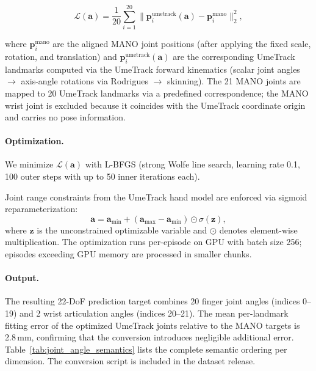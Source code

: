 \documentclass[letterpaper]{article} %
\begin{document}
\begin{equation}
\mathcal{L}(\mathbf{a}) = \frac{1}{20} \sum_{i=1}^{20} \bigl\|\mathbf{p}_i^{\text{umetrack}}(\mathbf{a}) - \mathbf{p}_i^{\text{mano}}\bigr\|_2^2,
\end{equation}

where $\mathbf{p}_i^{\text{mano}}$ are the aligned MANO joint positions (after applying the fixed scale, rotation, and translation) and $\mathbf{p}_i^{\text{umetrack}}(\mathbf{a})$ are the corresponding UmeTrack landmarks computed via the UmeTrack forward kinematics (scalar joint angles $\to$ axis-angle rotations via Rodrigues $\to$ skinning). The 21 MANO joints are mapped to 20 UmeTrack landmarks via a predefined correspondence; the MANO wrist joint is excluded because it coincides with the UmeTrack coordinate origin and carries no pose information.

\paragraph{Optimization.}
We minimize $\mathcal{L}(\mathbf{a})$ with L-BFGS (strong Wolfe line search,
learning rate 0.1, 100 outer steps with up to 50 inner iterations each).
\begin{samepage}
\noindent Joint range constraints from the UmeTrack hand model are enforced
via sigmoid reparameterization:
\[
\mathbf{a}
= \mathbf{a}_{\min}
+ \left(\mathbf{a}_{\max}-\mathbf{a}_{\min}\right)\odot\sigma(\mathbf{z}),
\]
where $\mathbf{z}$ is the unconstrained optimizable variable and $\odot$
denotes element-wise multiplication. The optimization runs per-episode on GPU
with batch size 256; episodes exceeding GPU memory are processed in smaller
chunks.
\end{samepage}

\paragraph{Output.}
The resulting 22-DoF prediction target combines 20 finger joint angles (indices 0--19) and 2 wrist articulation angles (indices 20--21). The mean per-landmark fitting error of the optimized UmeTrack joints relative to the MANO targets is 2.8\,mm, confirming that the conversion introduces negligible additional error. Table~\ref{tab:joint_angle_semantics} lists the complete semantic ordering per dimension. The conversion script is included in the dataset release.
\end{document}
